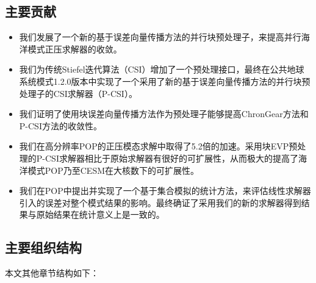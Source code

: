 \subsection{主要贡献}
\begin{itemize}
\item  
我们发展了一个新的基于误差向量传播方法的并行块预处理子\cite{roache1995elliptic}，来提高并行海洋模式正压求解器的收敛。 
\item  
我们为传统Stiefel迭代算法（CSI）\cite{hu2013scalable}增加了一个预处理接口，最终在公共地球系统模式1.2.0版本中实现了一个采用了新的基于误差向量传播方法的并行块预处理子的CSI求解器（P-CSI）。
\item  
我们证明了使用块误差向量传播方法作为预处理子能够提高ChronGear方法和P-CSI方法的收敛性。 
\item  
我们在高分辨率POP的正压模态求解中取得了5.2倍的加速。采用块EVP预处理的P-CSI求解器相比于原始求解器有很好的可扩展性，从而极大的提高了海洋模式POP乃至CESM在大核数下的可扩展性。 
\item  
我们在POP中提出并实现了一个基于集合模拟的统计方法，来评估线性求解器引入的误差对整个模式结果的影响。最终确证了采用我们的新的求解器得到结果与原始结果在统计意义上是一致的。 
\end{itemize}
\subsection{主要组织结构}
本文其他章节结构如下：


